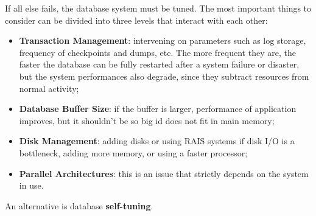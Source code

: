 If all else fails, the database system must be tuned. The most important things to consider can be divided into three levels that interact with each other:
\begin{itemize}
    \item \textbf{Transaction Management}: intervening on parameters such as log storage, frequency of checkpoints and dumps, etc. The more frequent they are, the faster the database can be fully restarted after a system failure or disaster, but the system performances also degrade, since they subtract resources from normal activity;

    \item \textbf{Database Buffer Size}: if the buffer is larger, performance of application improves, but it shouldn't be so big id does not fit in main memory;

    \item \textbf{Disk Management}: adding disks or using RAIS systems if disk I/O is a bottleneck, adding more memory, or using a faster processor;

    \item \textbf{Parallel Architectures}: this is an issue that strictly depends on the system in use.
\end{itemize}
An alternative is database \textbf{self-tuning}.